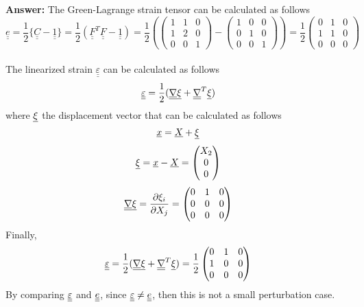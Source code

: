 \documentclass[letter,12pt]{article}
\newcommand{\TT}[1]{\underline{\underline{#1}}}
\begin{document}
	\textbf{Answer:} The Green-Lagrange strain tensor can be calculated as follows
	\begin{equation}
	  \TT{e} = \frac{1}{2} \{\TT{C} - \TT{1}\} = \frac{1}{2} (\TT{F}^T \TT{F} - \TT{1}) = \frac{1}{2}  \left( \left( \begin{matrix}
	  1 & 1 & 0 \\
	  1 & 2 & 0 \\
	  0 & 0 & 1
	  \end{matrix} \right)  - \left( \begin{matrix}
	  1 & 0 & 0 \\
	  0 & 1 & 0 \\
	  0 & 0 & 1
	  \end{matrix} \right) \right) 
	  =  
	  \frac{1}{2} \left( \begin{matrix}
	  0 & 1 & 0 \\
	  1 & 1 & 0 \\
	  0 & 0 & 0
	  \end{matrix} \right)
	\end{equation} \\
	The linearized strain $\TT{\varepsilon}$ can be calculated as follows
	\begin{equation}
	\underline{\underline{\varepsilon}} = \frac{1}{2} (\underline{\underline{\nabla}} \underline{\xi} + \underline{\underline{\nabla}}^T \underline{\xi})
	\end{equation}
	where $\underline{\xi}$ the displacement vector that can be calculated as follows
	\begin{equation}
	\underline{x} = \underline{X} + \underline{\xi}
	\end{equation}
	\begin{equation}
	\underline{\xi} = \underline{x} - \underline{X} = \left( \begin{matrix}
	X_2 \\
	0 \\
	0
	\end{matrix} \right)
	\end{equation}
	\begin{equation}
	\underline{\underline{\nabla}} \underline{\xi} = \frac{\partial \xi_i}{\partial X_j} = \left(  \begin{matrix}
	0 & 1 & 0 \\ 
	0 & 0 & 0 \\
	0 & 0 & 0
	\end{matrix}\right)
	\end{equation}
	Finally, 
		\begin{equation}
	\underline{\underline{\varepsilon}} = \frac{1}{2} (\underline{\underline{\nabla}} \underline{\xi} + \underline{\underline{\nabla}}^T \underline{\xi}) = \frac{1}{2} \left( \begin{matrix}
	0 & 1 & 0 \\
	1 & 0 & 0 \\
	0 & 0 & 0
	\end{matrix}\right)
	\end{equation}
	By comparing $\underline{\underline{\varepsilon}}$ and $\underline{\underline{e}}$, since  $\underline{\underline{\varepsilon}} \ne \underline{\underline{e}}$, then this is not a small perturbation case. \\
	
\end{document}
